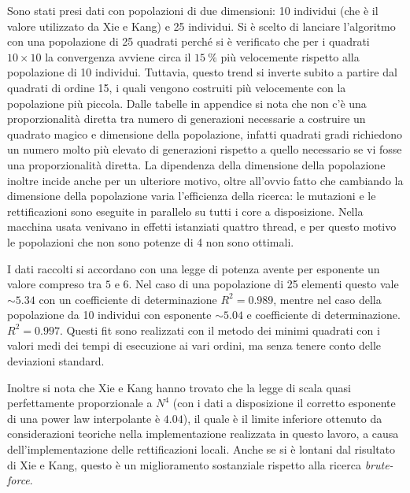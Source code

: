 \documentclass[italian,twoside,twocolumn]{article}
\begin{document}
Sono stati presi dati con popolazioni di due dimensioni: 10 individui (che è il valore utilizzato da Xie e Kang) e 25 individui. Si è scelto di lanciare l'algoritmo con una popolazione di 25 quadrati perché si è verificato che per i quadrati $ 10\times 10 $ la convergenza avviene circa il $ \SI{15}{\percent} $ più velocemente rispetto alla popolazione di 10 individui. Tuttavia, questo trend si inverte subito a partire dal quadrati di ordine 15, i quali vengono costruiti più velocemente con la popolazione più piccola. Dalle tabelle in appendice si nota che non c'è una proporzionalità diretta tra numero di generazioni necessarie a costruire un quadrato magico e dimensione della popolazione, infatti quadrati gradi richiedono un numero molto più elevato di generazioni rispetto a quello necessario se vi fosse una proporzionalità diretta. La dipendenza della dimensione della popolazione inoltre incide anche per un ulteriore motivo, oltre all'ovvio fatto che cambiando la dimensione della popolazione varia l'efficienza della ricerca: le mutazioni e le rettificazioni sono eseguite in parallelo su tutti i core a disposizione. Nella macchina usata venivano in effetti istanziati quattro thread, e per questo motivo le popolazioni che non sono potenze di 4 non sono ottimali.

I dati raccolti si accordano con una legge di potenza avente per esponente un valore compreso tra $ 5 $ e $ 6 $. Nel caso di una popolazione di 25 elementi questo vale $ \sim \num{5.34} $ con un coefficiente di determinazione $ R^2 = \num{0.989} $, mentre nel caso della popolazione da 10 individui con esponente $ \sim \num{5.04} $ e coefficiente di determinazione. $ R^2 = \num{0.997} $. Questi fit sono realizzati con il metodo dei minimi quadrati con i valori medi dei tempi di esecuzione ai vari ordini, ma senza tenere conto delle deviazioni standard.

Inoltre si nota che Xie e Kang hanno trovato che la legge di scala quasi perfettamente proporzionale a $ N^4 $ (con i dati a disposizione il corretto esponente di una power law interpolante è $ \num{4.04} $), il quale è il limite inferiore ottenuto da considerazioni teoriche nella implementazione realizzata in questo lavoro, a causa dell'implementazione delle rettificazioni locali.
Anche se si è lontani dal risultato di Xie e Kang, questo è un miglioramento sostanziale rispetto alla ricerca \emph{brute-force}.
\end{document}
